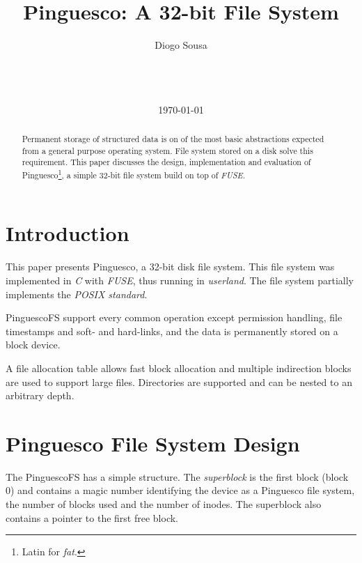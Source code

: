 \documentclass{acm_proc_article-sp}
\newcommand{\pfs}{Pinguesco\xspace}
\newcommand{\pfsfs}{PinguescoFS\xspace}
\begin{document}
\title{\pfs: A 32-bit File System}


\author{
  \alignauthor
  Diogo Sousa\\
  \\
  \\
  \\
}

\date{\today}

\maketitle

\begin{abstract}
Permanent storage of structured data is on of the most basic abstractions 
expected from a general purpose operating system. 
File system stored on a disk solve this requirement. 
This paper discusses the design, implementation and
evaluation of \pfs\footnote{Latin for \emph{fat}.}, a simple 32-bit 
file system build on top of \emph{FUSE}.
\end{abstract}



\section{Introduction}
This paper presents \pfs, a 32-bit disk file system. This file system
was implemented in \emph{C} with \emph{FUSE}, thus running in \emph{userland}.
The file system partially implements the \emph{POSIX standard}.

\pfsfs support every common operation except permission 
handling, file timestamps and soft- and hard-links, and the data
is permanently stored on a block device.

A file allocation table allows fast block allocation and multiple indirection
blocks are used to support large files. Directories are supported and can
be nested to an arbitrary depth.

\section{Pinguesco File System Design}
The \pfsfs has a simple structure. The \emph{superblock} is the first
block (block 0) and contains a magic number identifying the device
as a \pfs file system, the number of blocks used and the number of inodes.
The superblock also contains a pointer to the first free block.
\end{document}
